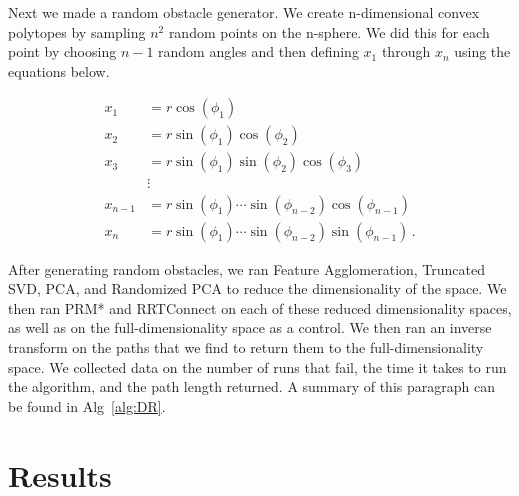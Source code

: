 \documentclass[12pt]{article}
\begin{document}
Next we made a random obstacle generator. We create n-dimensional convex polytopes by sampling $n^{2}$ random points on the n-sphere. We did this for each point by choosing $n-1$ random angles and then defining $x_1$ through $x_n$ using the equations below.

\begin{align*}
x_1 &= r \cos(\phi_1) \\
x_2 &= r \sin(\phi_1) \cos(\phi_2) \\
x_3 &= r \sin(\phi_1) \sin(\phi_2) \cos(\phi_3) \\
    &\vdots\\
x_{n-1} &= r \sin(\phi_1) \cdots \sin(\phi_{n-2}) \cos(\phi_{n-1}) \\
x_n &= r \sin(\phi_1) \cdots \sin(\phi_{n-2}) \sin(\phi_{n-1}) \,.
\end{align*}

After generating random obstacles, we ran Feature Agglomeration, Truncated SVD, PCA, and Randomized PCA to reduce the dimensionality of the space. We then ran PRM* and RRTConnect on each of these reduced dimensionality spaces, as well as on the full-dimensionality space as a control. We then ran an inverse transform on the paths that we find to return them to the full-dimensionality space. We collected data on the number of runs that fail, the time it takes to run the algorithm, and the path length returned. A summary of this paragraph can be found in Alg~\ref{alg:DR}. 

\section{Results}
\end{document}
